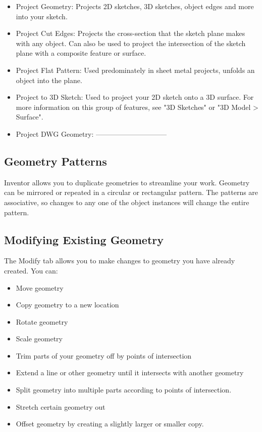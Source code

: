 \begin{itemize}
\item Project Geometry: Projects 2D sketches, 3D sketches, object edges and more into your sketch.
\item Project Cut Edges: Projects the cross-section that the sketch plane makes with any object. Can also be used to project the intersection of the sketch plane with a composite feature or surface.
\item Project Flat Pattern: Used predominately in sheet metal projects, unfolds an object into the plane.
\item Project to 3D Sketch: Used to project your 2D sketch onto a 3D surface. For more information on this group of features, see "3D Sketches" or "3D Model > Surface".
\item Project DWG Geometry:  ------------------------------
\end{itemize}

\subsection{Geometry Patterns}
Inventor allows you to duplicate geometries to streamline your work. Geometry can be mirrored or repeated in a circular or rectangular pattern. The patterns are associative, so changes to any one of the object instances will change the entire pattern.

\subsection{Modifying Existing Geometry}
The Modify tab allows you to make changes to geometry you have already created. You can:

\begin{itemize}
\item Move geometry
\item Copy geometry to a new location
\item Rotate geometry
\item Scale geometry
\item Trim parts of your geometry off by points of intersection
\item Extend a line or other geometry until it intersects with another geometry
\item Split geometry into multiple parts according to points of intersection.
\item Stretch certain geometry out
\item Offset geometry by creating a slightly larger or smaller copy.
\end{itemize}

